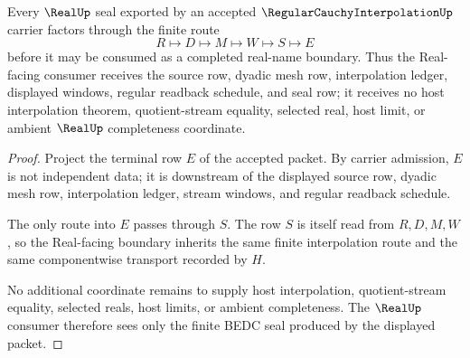 \begin{theorem}
\label{thm:regular-cauchy-interpolation-real-seal-nonescape}
Every $\RealUp$ seal exported by an accepted $\RegularCauchyInterpolationUp$ carrier factors through the finite route
$$
R\longmapsto D\longmapsto M\longmapsto W\longmapsto S\longmapsto E
$$
before it may be consumed as a completed real-name boundary. Thus the Real-facing consumer receives the source row, dyadic mesh row, interpolation ledger, displayed windows, regular readback schedule, and seal row; it receives no host interpolation theorem, quotient-stream equality, selected real, host limit, or ambient $\RealUp$ completeness coordinate.
\end{theorem}
\begin{proof}
Project the terminal row $E$ of the accepted packet. By carrier admission, $E$ is not independent data; it is downstream of the displayed source row, dyadic mesh row, interpolation ledger, stream windows, and regular readback schedule.

The only route into $E$ passes through $S$. The row $S$ is itself read from $R,D,M,W$, so the Real-facing boundary inherits the same finite interpolation route and the same componentwise transport recorded by $H$.

No additional coordinate remains to supply host interpolation, quotient-stream equality, selected reals, host limits, or ambient completeness. The $\RealUp$ consumer therefore sees only the finite BEDC seal produced by the displayed packet.
\end{proof}


\begin{closurestatus}{\RegularCauchyInterpolationUp}
  \theoryclosure{\seedClosure}
  \formalstatus{\unformalizedV}
\end{closurestatus}

